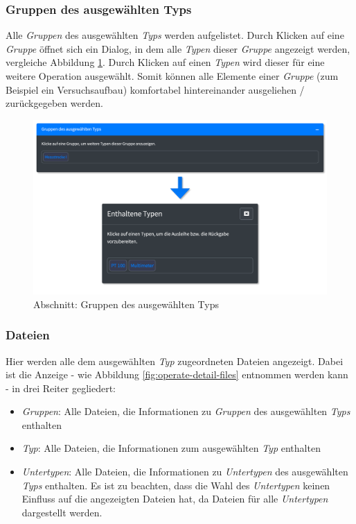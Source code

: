 \documentclass[
]{article}
\providecommand{\tightlist}{%
  \setlength{\itemsep}{0pt}\setlength{\parskip}{0pt}}
\begin{document}
\hypertarget{gruppen-des-ausgewuxe4hlten-typs}{%
\subsubsection{Gruppen des ausgewählten Typs}\label{gruppen-des-ausgewuxe4hlten-typs}}

Alle \emph{Gruppen} des ausgewählten \emph{Typs} werden aufgelistet. Durch Klicken auf eine \emph{Gruppe} öffnet sich ein Dialog, in dem alle \emph{Typen} dieser \emph{Gruppe} angezeigt werden, vergleiche Abbildung \ref{fig:operate-detail-groups}. Durch Klicken auf einen \emph{Typen} wird dieser für eine weitere Operation ausgewählt. Somit können alle Elemente einer \emph{Gruppe} (zum Beispiel ein Versuchsaufbau) komfortabel hintereinander ausgeliehen / zurückgegeben werden.

\begin{figure}
\centering
\includegraphics{./img/operate_detail_groups.png}
\caption{\label{fig:operate-detail-groups}Abschnitt: Gruppen des ausgewählten Typs}
\end{figure}

\hypertarget{dateien}{%
\subsubsection{Dateien}\label{dateien}}

Hier werden alle dem ausgewählten \emph{Typ} zugeordneten Dateien angezeigt. Dabei ist die Anzeige - wie Abbildung \ref{fig:operate-detail-files} entnommen werden kann - in drei Reiter gegliedert:

\begin{itemize}
\tightlist
\item
  \emph{Gruppen}: Alle Dateien, die Informationen zu \emph{Gruppen} des ausgewählten \emph{Typs} enthalten
\item
  \emph{Typ}: Alle Dateien, die Informationen zum ausgewählten \emph{Typ} enthalten
\item
  \emph{Untertypen}: Alle Dateien, die Informationen zu \emph{Untertypen} des ausgewählten \emph{Typs} enthalten. Es ist zu beachten, dass die Wahl des \emph{Untertypen} keinen Einfluss auf die angezeigten Dateien hat, da Dateien für alle \emph{Untertypen} dargestellt werden.
\end{itemize}
\end{document}
